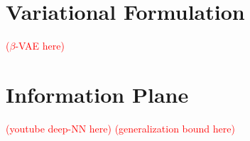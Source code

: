\documentclass[11pt]{article}
\newcommand\myworries[1]{\textcolor{red}{(#1)}}
\begin{document}
\section{Variational Formulation}


\myworries{$\beta$-VAE here}

\section{Information Plane}




\myworries{youtube deep-NN here}
\myworries{generalization bound here}


 
\end{document}
